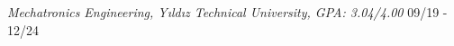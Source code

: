 \documentclass[letter,14pt]{article}
\begin{document}
\textit{Mechatronics Engineering, Yıldız Technical University, GPA: 3.04/4.00} 	\hfill 09/19 - 12/24 \scriptsize{} 
\end{document}
